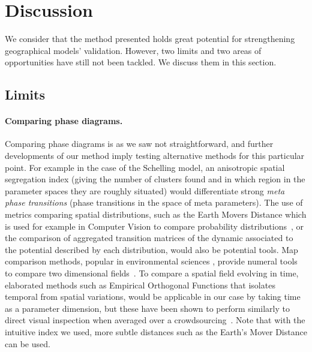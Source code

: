 \documentclass[Royal,sageh,times]{sagej}
\begin{document}
\section{Discussion}

We consider that the method presented holds great potential for strengthening geographical models' validation. However, two limits and two areas of opportunities have still not been tackled. We discuss them in this section.

\subsection{Limits}

\paragraph{Comparing phase diagrams.} Comparing phase diagrams is as we saw not straightforward, and further developments of our method imply testing alternative methods for this particular point. For example in the case of the Schelling model, an anisotropic spatial segregation index (giving the number of clusters found and in which region in the parameter spaces they are roughly situated) would differentiate strong \emph{meta phase transitions} (phase transitions in the space of meta parameters). The use of metrics comparing spatial distributions, such as the Earth Movers Distance which is used for example in Computer Vision to compare probability distributions~\cite{rubner2000earth}, or the comparison of aggregated transition matrices of the dynamic associated to the potential described by each distribution, would also be potential tools. Map comparison methods, popular in environmental sciences , provide numeral tools to compare two dimensional fields~\cite{visser2006map}. To compare a spatial field evolving in time, elaborated methods such as Empirical Orthogonal Functions that isolates temporal from spatial variations, would be applicable in our case by taking time as a parameter dimension, but these have been shown to perform similarly to direct visual inspection when averaged over a crowdsourcing~\cite{10.1371/journal.pone.0178165}. Note that with the intuitive index we used, more subtle distances such as the Earth's Mover Distance can be used.
\end{document}
